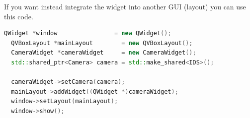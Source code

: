 If you want instead integrate the widget into another GUI (layout) you
can use this code.

\begin{lstlisting}[language=c++, gobble=2]
  QWidget *window                = new QWidget();
  QVBoxLayout *mainLayout        = new QVBoxLayout();
  CameraWidget *cameraWidget     = new CameraWidget();
  std::shared_ptr<Camera> camera = std::make_shared<IDS>();
  
  cameraWidget->setCamera(camera);
  mainLayout->addWidget((QWidget *)cameraWidget);
  window->setLayout(mainLayout);
  window->show();
\end{lstlisting}


